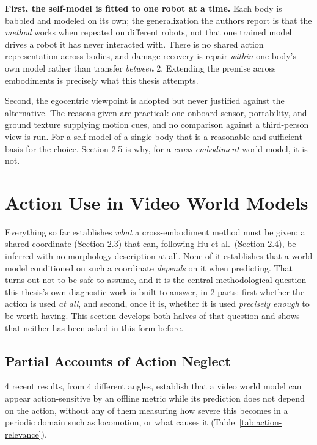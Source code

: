 \documentclass[12pt,a4paper,oneside]{report}
\begin{document}
\textbf{First, the self-model is fitted to one robot at a time.} Each body is babbled and modeled on
its own; the generalization the authors report is that the \emph{method} works when repeated on
different robots, not that one trained model drives a robot it has never interacted with. There is no
shared action representation across bodies, and damage recovery is repair \emph{within} one body's own
model rather than transfer \emph{between} 2. Extending the premise across embodiments is precisely
what this thesis attempts.

Second, the egocentric viewpoint is adopted but never justified against the alternative. The
reasons given are practical: one onboard sensor, portability, and ground texture supplying motion
cues, and no comparison against a third-person view is run. For a self-model of a single body that
is a reasonable and sufficient basis for the choice. Section 2.5 is why, for a \emph{cross-embodiment}
world model, it is not.

\section{Action Use in Video World Models}
Everything so far establishes \emph{what} a cross-embodiment method must be given: a shared
coordinate (Section 2.3) that can, following Hu et al.\ (Section 2.4), be inferred with no morphology
description at all. None of it establishes that a world model conditioned on such a coordinate
\emph{depends} on it when predicting. That turns out not to be safe to assume, and it is the
central methodological question this thesis's own diagnostic work is built to answer, in
2 parts: first whether the action is used \emph{at all}, and second, once it is, whether it is used
\emph{precisely enough} to be worth having. This section develops both halves of that question and
shows that neither has been asked in this form before.

\newpage
\subsection{Partial Accounts of Action Neglect}
4 recent results, from 4 different angles, establish that a video world model can appear
action-sensitive by an offline metric while its prediction does not depend on the action,
without any of them measuring how severe this becomes in a periodic domain such as locomotion, or
what causes it (Table~\ref{tab:action-relevance}).
\end{document}
